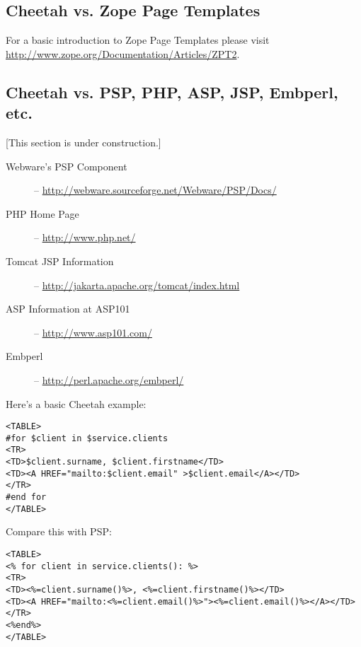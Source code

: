 \subsection{Cheetah vs. Zope Page Templates}
\label{comparisons.zpt}

For a basic introduction to Zope Page Templates please visit
\url{http://www.zope.org/Documentation/Articles/ZPT2}.

\subsection{Cheetah vs. PSP, PHP, ASP, JSP, Embperl, etc.}
\label{comparisons.pspEtc}

[This section is under construction.]

\begin{description}
\item[Webware's PSP Component] -- \url{http://webware.sourceforge.net/Webware/PSP/Docs/}
\item[PHP Home Page] -- \url{http://www.php.net/}
\item[Tomcat JSP Information] -- \url{http://jakarta.apache.org/tomcat/index.html}
\item[ASP Information at ASP101] -- \url{http://www.asp101.com/}
\item[Embperl] -- \url{http://perl.apache.org/embperl/}
\end{description}


Here's a basic Cheetah example:
\begin{verbatim}
<TABLE>
#for $client in $service.clients
<TR>
<TD>$client.surname, $client.firstname</TD>
<TD><A HREF="mailto:$client.email" >$client.email</A></TD>
</TR>
#end for
</TABLE>
\end{verbatim}

Compare this with PSP:

\begin{verbatim}
<TABLE>
<% for client in service.clients(): %>
<TR>
<TD><%=client.surname()%>, <%=client.firstname()%></TD>
<TD><A HREF="mailto:<%=client.email()%>"><%=client.email()%></A></TD>
</TR>
<%end%>
</TABLE>
\end{verbatim}


